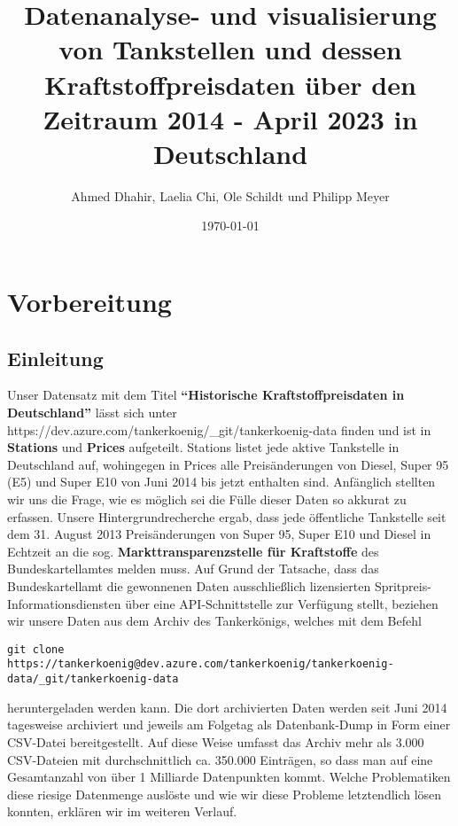 \documentclass[11pt]{article}
\title{Datenanalyse- und visualisierung von Tankstellen und dessen Kraftstoffpreisdaten über den Zeitraum 2014 - April 2023 in Deutschland}
\author{Ahmed Dhahir, Laelia Chi, Ole Schildt und Philipp Meyer}
\date{\today}
\begin{document}
    
    \maketitle
    

    
    \hypertarget{vorbereitung}{%
\section{Vorbereitung}\label{vorbereitung}}

    \hypertarget{einleitung}{%
\subsection{Einleitung}\label{einleitung}}

    Unser Datensatz mit dem Titel \textbf{``Historische Kraftstoffpreisdaten
in Deutschland''} lässt sich unter
https://dev.azure.com/tankerkoenig/\_git/tankerkoenig-data finden und
ist in \textbf{Stations} und \textbf{Prices} aufgeteilt. Stations listet
jede aktive Tankstelle in Deutschland auf, wohingegen in Prices alle
Preisänderungen von Diesel, Super 95 (E5) und Super E10 von Juni 2014
bis jetzt enthalten sind. Anfänglich stellten wir uns die Frage, wie es
möglich sei die Fülle dieser Daten so akkurat zu erfassen. Unsere
Hintergrundrecherche ergab, dass jede öffentliche Tankstelle seit dem
31. August 2013 Preisänderungen von Super 95, Super E10 und Diesel in
Echtzeit an die sog. \textbf{Markttransparenzstelle für Kraftstoffe} des
Bundeskartellamtes melden muss. Auf Grund der Tatsache, dass das
Bundeskartellamt die gewonnenen Daten ausschließlich lizensierten
Spritpreis-Informationsdiensten über eine API-Schnittstelle zur
Verfügung stellt, beziehen wir unsere Daten aus dem Archiv des Tankerkönigs, welches mit dem Befehl

\begin{lstlisting}
git clone https://tankerkoenig@dev.azure.com/tankerkoenig/tankerkoenig-data/_git/tankerkoenig-data
\end{lstlisting}

heruntergeladen werden kann. Die dort archivierten Daten werden seit
Juni 2014 tagesweise archiviert und jeweils am Folgetag als
Datenbank-Dump in Form einer CSV-Datei bereitgestellt. Auf diese Weise
umfasst das Archiv mehr als 3.000 CSV-Dateien mit durchschnittlich ca.
350.000 Einträgen, so dass man auf eine Gesamtanzahl von über 1
Milliarde Datenpunkten kommt. Welche Problematiken diese riesige
Datenmenge auslöste und wie wir diese Probleme letztendlich lösen
konnten, erklären wir im weiteren Verlauf.
\end{document}
